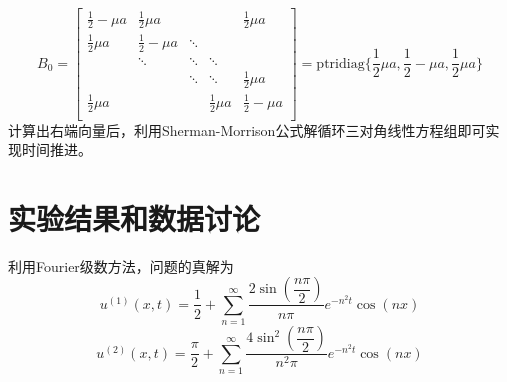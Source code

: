 \documentclass[UTF8,a4paper,10pt]{ctexart}
\begin{document}
$$
    B_0 =
    \begin{bmatrix}
        \frac{1}{2} - \mu a & \frac{1}{2} \mu a   &        &                   & \frac{1}{2} \mu a   \\
        \frac{1}{2} \mu a   & \frac{1}{2} - \mu a & \ddots &                   &                     \\
                            & \ddots              & \ddots & \ddots            &                     \\
                            &                     & \ddots & \ddots            & \frac{1}{2} \mu a   \\
        \frac{1}{2} \mu a   &                     &        & \frac{1}{2} \mu a & \frac{1}{2} - \mu a \\
    \end{bmatrix}
    = \mathrm{ptridiag} \{\dfrac{1}{2} \mu a, \dfrac{1}{2} - \mu a, \dfrac{1}{2} \mu a\}
$$
计算出右端向量后，利用Sherman-Morrison公式解循环三对角线性方程组即可实现时间推进。

\section{实验结果和数据讨论}
利用Fourier级数方法，问题的真解为
$$
    u^{(1)}(x,t) = \dfrac{1}{2} + \sum_{n=1}^{\infty}\dfrac{2 \sin \left( \dfrac{n \pi}{2} \right) }{n \pi} e^{-n^2t} \cos(nx)
$$
$$
    u^{(2)}(x,t) = \dfrac{\pi}{2} + \sum_{n=1}^{\infty} \dfrac{4 \sin^2 \left( \dfrac{n \pi}{2} \right)}{n^2 \pi} e^{-n^2 t} \cos(nx)
$$
\end{document}
